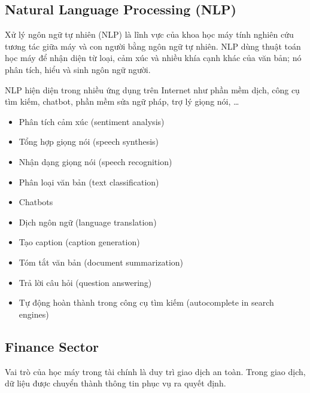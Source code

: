 \subsection{Natural Language Processing (NLP)}

\begin{dinhnghia}[title={NLP là gì?}]
Xử lý ngôn ngữ tự nhiên (NLP) là lĩnh vực của khoa học máy tính nghiên cứu tương tác giữa máy và con người bằng ngôn ngữ tự nhiên.
NLP dùng thuật toán học máy để nhận diện từ loại, cảm xúc và nhiều khía cạnh khác của văn bản; nó phân tích, hiểu và sinh ngôn ngữ người.
\end{dinhnghia}

\begin{ynghia}[title={NLP xuất hiện ở đâu?}]
NLP hiện diện trong nhiều ứng dụng trên Internet như phần mềm dịch, công cụ tìm kiếm, chatbot, phần mềm sửa ngữ pháp, trợ lý giọng nói, \ldots
\end{ynghia}

\begin{phuongphap}[title={Một số ứng dụng NLP}]
\begin{itemize}
  \item Phân tích cảm xúc (sentiment analysis)
  \item Tổng hợp giọng nói (speech synthesis)
  \item Nhận dạng giọng nói (speech recognition)
  \item Phân loại văn bản (text classification)
  \item Chatbots
  \item Dịch ngôn ngữ (language translation)
  \item Tạo caption (caption generation)
  \item Tóm tắt văn bản (document summarization)
  \item Trả lời câu hỏi (question answering)
  \item Tự động hoàn thành trong công cụ tìm kiếm (autocomplete in search engines)
\end{itemize}
\end{phuongphap}

\subsection{Finance Sector}

\begin{dongco}[title={ML trong tài chính}]
Vai trò của học máy trong tài chính là duy trì giao dịch an toàn.
Trong giao dịch, dữ liệu được chuyển thành thông tin phục vụ ra quyết định.
\end{dongco}

